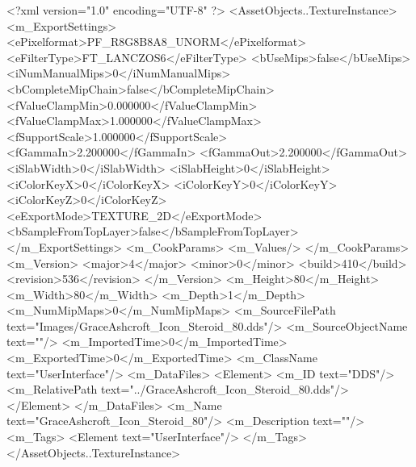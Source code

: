 <?xml version="1.0" encoding="UTF-8" ?>
<AssetObjects..TextureInstance>
	<m_ExportSettings>
		<ePixelformat>PF_R8G8B8A8_UNORM</ePixelformat>
		<eFilterType>FT_LANCZOS6</eFilterType>
		<bUseMips>false</bUseMips>
		<iNumManualMips>0</iNumManualMips>
		<bCompleteMipChain>false</bCompleteMipChain>
		<fValueClampMin>0.000000</fValueClampMin>
		<fValueClampMax>1.000000</fValueClampMax>
		<fSupportScale>1.000000</fSupportScale>
		<fGammaIn>2.200000</fGammaIn>
		<fGammaOut>2.200000</fGammaOut>
		<iSlabWidth>0</iSlabWidth>
		<iSlabHeight>0</iSlabHeight>
		<iColorKeyX>0</iColorKeyX>
		<iColorKeyY>0</iColorKeyY>
		<iColorKeyZ>0</iColorKeyZ>
		<eExportMode>TEXTURE_2D</eExportMode>
		<bSampleFromTopLayer>false</bSampleFromTopLayer>
	</m_ExportSettings>
	<m_CookParams>
		<m_Values/>
	</m_CookParams>
	<m_Version>
		<major>4</major>
		<minor>0</minor>
		<build>410</build>
		<revision>536</revision>
	</m_Version>
	<m_Height>80</m_Height>
	<m_Width>80</m_Width>
	<m_Depth>1</m_Depth>
	<m_NumMipMaps>0</m_NumMipMaps>
	<m_SourceFilePath text="Images/GraceAshcroft_Icon_Steroid_80.dds"/>
	<m_SourceObjectName text=""/>
	<m_ImportedTime>0</m_ImportedTime>
	<m_ExportedTime>0</m_ExportedTime>
	<m_ClassName text="UserInterface"/>
	<m_DataFiles>
		<Element>
			<m_ID text="DDS"/>
			<m_RelativePath text="../GraceAshcroft_Icon_Steroid_80.dds"/>
		</Element>
	</m_DataFiles>
	<m_Name text="GraceAshcroft_Icon_Steroid_80"/>
	<m_Description text=""/>
	<m_Tags>
		<Element text="UserInterface"/>
	</m_Tags>
</AssetObjects..TextureInstance>
